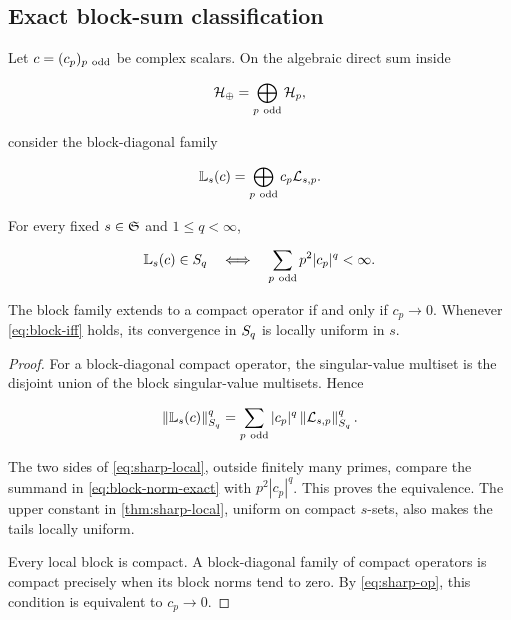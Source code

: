 \subsection{Exact block-sum classification}

Let \(c=(c_p)_{p\ \mathrm{odd}}\) be complex scalars.  On the algebraic direct sum
inside

\[
 \cH_\oplus=\bigoplus_{p\ \odd}\cH_p,
\]

consider the block-diagonal family

\begin{equation}
 \mathbb L_s(c)=\bigoplus_{p\ \odd}c_p\cL_{s,p}.
 \label{eq:general-block}
\end{equation}

\begin{theorem}
\label{thm:block-iff}
For every fixed \(s\in\mathfrak S\) and \(1\le q<\infty\),

\begin{equation}
 \mathbb L_s(c)\in S_{q}
 \quad\Longleftrightarrow\quad
 \sum_{p\ \mathrm{odd}}p^2|c_p|^q<\infty.
 \label{eq:block-iff}
\end{equation}

The block family extends to a compact operator if and only if
\(c_p\to0\).  Whenever \cref{eq:block-iff} holds, its convergence in
\(S_{q}\) is locally uniform in \(s\).
\end{theorem}

\begin{proof}
For a block-diagonal compact operator, the singular-value multiset is the
disjoint union of the block singular-value multisets.  Hence

\begin{equation}
 \left\lVert\mathbb L_s(c)\right\rVert_{S_{q}}^q
 =\sum_{p\ \mathrm{odd}}|c_p|^q\left\lVert\mathcal L_{s,p}\right\rVert_{S_{q}}^q.
 \label{eq:block-norm-exact}
\end{equation}

The two sides of \cref{eq:sharp-local}, outside finitely many primes, compare
the summand in \cref{eq:block-norm-exact} with \(p^2|c_p|^q\).  This proves
the equivalence.  The upper constant in \cref{thm:sharp-local}, uniform on
compact \(s\)-sets, also makes the tails locally uniform.

Every local block is compact.  A block-diagonal family of compact operators
is compact precisely when its block norms tend to zero.  By
\cref{eq:sharp-op}, this condition is equivalent to \(c_p\to0\).
\end{proof}

